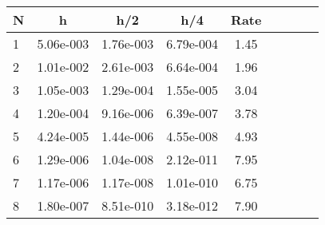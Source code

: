 \begin{tabular}{lcccccccc}
N & h & h/2 & h/4 & Rate\\
\hline
1& 5.06e-003& 1.76e-003& 6.79e-004& 1.45\\
2& 1.01e-002& 2.61e-003& 6.64e-004& 1.96\\
3& 1.05e-003& 1.29e-004& 1.55e-005& 3.04\\
4& 1.20e-004& 9.16e-006& 6.39e-007& 3.78\\
5& 4.24e-005& 1.44e-006& 4.55e-008& 4.93\\
6& 1.29e-006& 1.04e-008& 2.12e-011& 7.95\\
7& 1.17e-006& 1.17e-008& 1.01e-010& 6.75\\
8& 1.80e-007& 8.51e-010& 3.18e-012& 7.90\\
\hline
\end{tabular}
